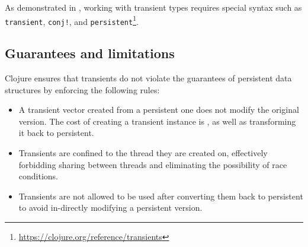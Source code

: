 As demonstrated in , working with transient types requires special syntax such as \texttt{transient}, \texttt{conj!}, and \texttt{persistent}\footnote{\url{https://clojure.org/reference/transients}}.

\subsection{Guarantees and limitations}
Clojure ensures that transients do not violate the guarantees of persistent data structures by enforcing the following rules:
\begin{itemize}
    \item A transient vector created from a persistent one does not modify the original version. The cost of creating a transient instance is , as well as transforming it back to persistent.
    \item Transients are confined to the thread they are created on, effectively forbidding sharing between threads and eliminating the possibility of race conditions.
    \item Transients are not allowed to be used after converting them back to persistent to avoid in-directly modifying a persistent version.
\end{itemize}
